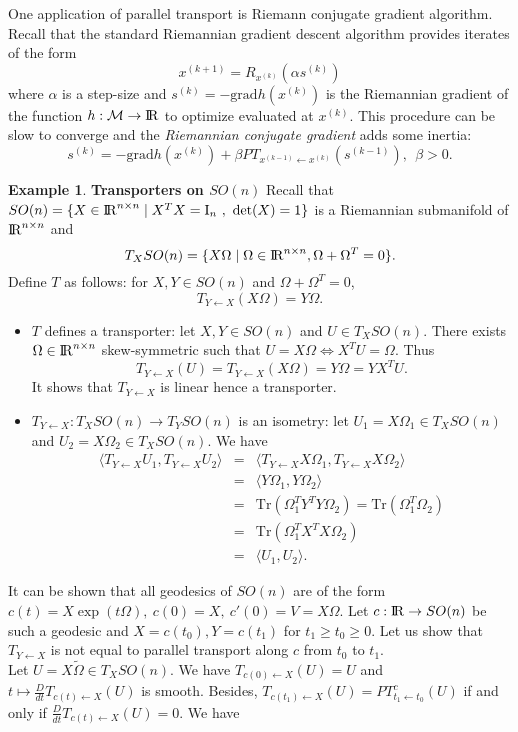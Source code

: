 \documentclass[10pt,a4paper]{book}
\theoremstyle{definition}
\newtheorem{exm}{Example}[section]
\theoremstyle{plain}
\theoremstyle{remark}
\newcommand{\grad}{\textrm{grad}}
\newcommand \M {\mathcal{M}}
\def\R{{\rm I\kern-0.16em R}}
\begin{document}
One application of parallel transport is Riemann conjugate gradient algorithm. Recall that the standard Riemannian gradient descent algorithm provides iterates of the form
$$x^{(k+1)}=R_{x^{(k)}}(\alpha s^{(k)})$$ where $\alpha$ is a step-size and $s^{(k)}=-\grad h(x^{(k)})$ is the Riemannian gradient of the function $h:\M \to \R$ to optimize evaluated at $x^{(k)}$. This procedure can be slow to converge and the \emph{Riemannian conjugate gradient} adds some inertia:
$$s^{(k)}=-\grad h(x^{(k)})+\beta PT_{x^{(k-1)}\leftarrow x^{(k)}}(s^{(k-1)}),~~\beta>0.$$



\begin{exm}\textbf{Transporters on $SO(n)$}
Recall that $SO(n)=\{X\in \R^{n\times n} \mid X^TX=\text{I}_n~,~\det(X)=1\}$ is a Riemannian submanifold of $\R^{n\times n}$ and
$$T_X SO(n)=\{X\Omega \mid \Omega \in \R^{n\times n}, \Omega+\Omega^{T}=0\}.$$
Define $T$ as follows: for $X,Y \in SO(n)$ and $\Omega+\Omega^{T}=0$, 
$$T_{Y\leftarrow X}(X\Omega)=Y\Omega.$$
\begin{itemize}
\item $T$ defines a transporter: let $X,Y \in SO(n)$ and $U\in T_XSO(n)$. There exists $\Omega \in \R^{n\times n}$ skew-symmetric such that $U=X\Omega \iff X^{T}U=\Omega$. Thus
$$T_{Y\leftarrow X}(U)=T_{Y\leftarrow X}(X\Omega)=Y\Omega=YX^{T}U.$$
It shows that $T_{Y\leftarrow X}$ is linear hence a transporter.
\item $T_{Y\leftarrow X}: T_XSO(n)\to T_YSO(n)$ is an isometry: let $U_1=X\Omega_1\in T_XSO(n)$ and $U_2=X\Omega_2\in T_XSO(n)$. We have
\begin{eqnarray*}
\langle T_{Y\leftarrow X}U_1,T_{Y\leftarrow X}U_2\rangle&=&\langle T_{Y\leftarrow X}X\Omega_1,T_{Y\leftarrow X}X\Omega_2\rangle\\
&=&\langle Y\Omega_1,Y\Omega_2\rangle \\
&=&\text{Tr}(\Omega_1^{T}Y^TY\Omega_2)=\text{Tr}(\Omega_1^T\Omega_2)\\
&=&\text{Tr}(\Omega_1^{T}X^TX\Omega_2)\\
&=&\langle U_1,U_2\rangle.
\end{eqnarray*}
\end{itemize}
It can be shown that all geodesics of $SO(n)$ are of the form $c(t)= X\exp(t\Omega),~c(0)=X,~c'(0)=V=X\Omega$. Let $c:\R \to SO(n)$ be such a geodesic and $X=c(t_0), Y=c(t_1)$ for $t_1\ge t_0\ge 0$. Let us show that $T_{Y\leftarrow X}$ is not equal to parallel transport along $c$ from $t_0$ to $t_1$. \\ Let $U=X\tilde{\Omega} \in T_XSO(n)$. We have $T_{c(0)\leftarrow X}(U)=U$ and $t\mapsto \frac{D}{dt}T_{c(t) \leftarrow X}(U)$ is smooth. Besides, $T_{c(t_1)\leftarrow X}(U)=PT_{t_1\leftarrow t_0}^{c}(U)$ if and only if $\frac{D}{dt}T_{c(t)\leftarrow X}(U)=0$. We have

\end{exm}
\end{document}
